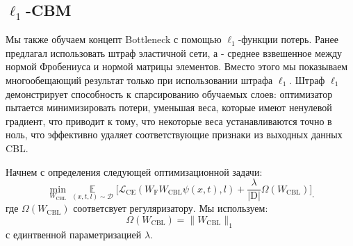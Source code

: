 \subsection{$\boldsymbol\ell_1$-CBM}
\label{sec:ellcbm}

Мы также обучаем концепт Bottleneck с помощью $\ell_1$-функции потерь. Ранее \cite{yuksekgonul2023posthoc} предлагал использовать штраф эластичной сети, а \cite{oikarinen2023labelfree} - среднее взвешенное между нормой Фробениуса и нормой матрицы элементов. Вместо этого мы показываем многообещающий результат только при использовании штрафа $\ell_1$. Штраф $\ell_1$ демонстрирует способность к спарсированию обучаемых слоев: оптимизатор пытается минимизировать потери, уменьшая веса, которые имеют ненулевой градиент, что приводит к тому, что некоторые веса устанавливаются точно в ноль, что эффективно удаляет соответствующие признаки из выходных данных CBL.

Начнем с определения следующей оптимизационной задачи:
\[
\min \limits_{W_{\mathrm{CBL}}} \mathop{\mathbb{E}}\limits_{(x, t, l)\sim\mathcal{D}}\big[\mathcal{L}_{\mathrm{CE}}(W_{\mathrm{F}}W_{\mathrm{CBL}}\psi(x, t), l) + \frac{\lambda}{|\mathrm{D}|}\Omega(W_{\mathrm{CBL}}) \big]_,
\]\label{eq:l1probl}где $\Omega(W_{\mathrm{CBL}})$ соответсвует регуляризатору. Мы используем:
\[
\Omega(W_{\mathrm{CBL}}) = \|W_{\mathrm{CBL}}\|_1
\] 
с единтвенной параметризацией $\lambda$. 